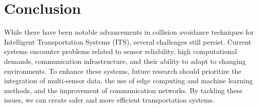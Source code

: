 \documentclass[12pt,twocolumn]{article}
\begin{document}
\section{Conclusion}
While there have been notable advancements in collision avoidance techniques for Intelligent Transportation Systems (ITS), several challenges still persist. Current systems encounter problems related to sensor reliability, high computational demands, communication infrastructure, and their ability to adapt to changing environments. To enhance these systems, future research should prioritize the integration of multi-sensor data, the use of edge computing and machine learning methods, and the improvement of communication networks. By tackling these issues, we can create safer and more efficient transportation systems.

 
\end{document}
